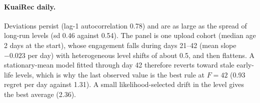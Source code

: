 \documentclass[11pt]{article}
\theoremstyle{definition}
\theoremstyle{remark}
\begin{document}
\paragraph{KuaiRec daily.} Deviations persist (lag-1 autocorrelation 0.78) and are as large as the spread of long-run levels (sd 0.46 against 0.54). The panel is one upload cohort (median age 2 days at the start), whose engagement falls during days 21--42 (mean slope $-0.023$ per day) with heterogeneous level shifts of about 0.5, and then flattens. A stationary-mean model fitted through day 42 therefore reverts toward stale early-life levels, which is why the last observed value is the best rule at $F=42$ (0.93 regret per day against 1.31). A small likelihood-selected drift in the level gives the best average (2.36).

\begin{table}[t]\centering\small
{}
\caption{Web platforms, regret per day. KuaiRec: mean over $F\in\{28,35,42\}$ (5 seeds for stochastic policies). Wikipedia: mean over three origins and 5 noise seeds. Graph row: greedy policies, except $^*$persistent sampling on KuaiRec. On six domains, community blocks give 1.290 (greedy) and 1.456 (predictive sampling, against 1.500 with the common factor).}\label{tab:web}
\end{table}
\end{document}
